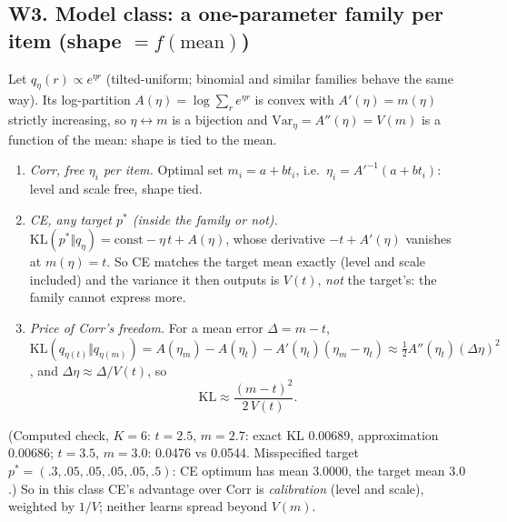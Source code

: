 \documentclass[11pt]{article}
\begin{document}
\subsection*{W3. Model class: a one-parameter family per item (shape $=f(\text{mean})$)}
Let $q_\eta(r)\propto e^{\eta r}$ (tilted-uniform; binomial and similar families behave the same way). Its log-partition $A(\eta)=\log\sum_r e^{\eta r}$ is convex with $A'(\eta)=m(\eta)$ strictly increasing, so $\eta\leftrightarrow m$ is a bijection and $\mathrm{Var}_\eta=A''(\eta)=V(m)$ is a function of the mean: shape is tied to the mean.
\begin{enumerate}
\item \emph{Corr, free $\eta_i$ per item.} Optimal set $m_i=a+bt_i$, i.e.\ $\eta_i=A'^{-1}(a+bt_i)$: level and scale free, shape tied.
\item \emph{CE, any target $p^\ast$ (inside the family or not).} $\mathrm{KL}(p^\ast\Vert q_\eta)=\text{const}-\eta\,t+A(\eta)$, whose derivative $-t+A'(\eta)$ vanishes at $m(\eta)=t$. So CE matches the target mean exactly (level and scale included) and the variance it then outputs is $V(t)$, \emph{not} the target's: the family cannot express more.
\item \emph{Price of Corr's freedom.} For a mean error $\Delta=m-t$, $\mathrm{KL}(q_{\eta(t)}\Vert q_{\eta(m)})=A(\eta_m)-A(\eta_t)-A'(\eta_t)(\eta_m-\eta_t)\approx\tfrac12 A''(\eta_t)(\Delta\eta)^2$, and $\Delta\eta\approx\Delta/V(t)$, so
\[
\mathrm{KL}\approx\frac{(m-t)^2}{2\,V(t)}.
\]
\end{enumerate}
(Computed check, $K=6$: $t=2.5$, $m=2.7$: exact KL 0.00689, approximation 0.00686; $t=3.5$, $m=3.0$: 0.0476 vs 0.0544. Misspecified target $p^\ast=(.3,.05,.05,.05,.05,.5)$: CE optimum has mean $3.0000$, the target mean $3.0$.)
So in this class CE's advantage over Corr is \emph{calibration} (level and scale), weighted by $1/V$; neither learns spread beyond $V(m)$.
\end{document}
